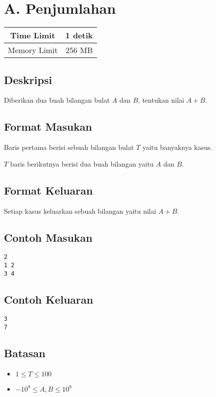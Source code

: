 \documentclass{article}
\begin{document}
\section*{\hfil A. Penjumlahan\hfil}

\begin{center}
\begin{tabular}{ |cc| } 
 \hline
 Time Limit & 1 detik \\ 
 \hline
 Memory Limit & 256 MB \\
 \hline
\end{tabular}
\end{center}

\subsection*{Deskripsi}

\par\noindent Diberikan dua buah bilangan bulat $A$ dan $B$, tentukan nilai $A + B$.

\subsection*{Format Masukan}

\par\noindent Baris pertama berisi sebuah bilangan bulat $T$ yaitu banyaknya kasus.
\par\noindent $T$ baris berikutnya berisi dua buah bilangan yaitu $A$ dan $B$.

\subsection*{Format Keluaran}

\par\noindent Setiap kasus keluarkan sebuah bilangan yaitu nilai $A + B$.

\subsection*{Contoh Masukan}

\begin{lstlisting}
2
1 2
3 4
\end{lstlisting}

\subsection*{Contoh Keluaran}

\begin{lstlisting}
3
7
\end{lstlisting}


\subsection*{Batasan}

\begin{itemize}
	\item $1 \leq T \leq 100$
	\item $-10^9 \leq A, B \leq 10^9$
\end{itemize}
\end{document}
